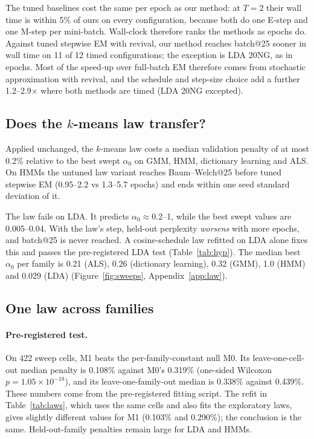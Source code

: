 \documentclass[10pt]{article}
\begin{document}
The tuned baselines cost the same per epoch as our method: at $T = 2$ their wall time is within 5\% of ours on every
configuration, because both do one E-step and one M-step per mini-batch. Wall-clock therefore ranks the methods as
epochs do. Against tuned stepwise EM with revival, our method reaches batch@25 sooner in wall time on 11 of 12 timed
configurations; the exception is LDA 20NG, as in epochs. Most of the speed-up over full-batch EM therefore comes from
stochastic approximation with revival, and the schedule and step-size choice add a further 1.2--2.9$\times$ where
both methods are timed (LDA 20NG excepted).

\subsection{Does the $k$-means law transfer?}\label{sec:res-kmlaw}

Applied unchanged, the $k$-means law costs a median validation penalty of at most 0.2\% relative to the best swept
$\alpha_0$ on GMM, HMM, dictionary learning and ALS. On HMMs the untuned law variant reaches Baum--Welch@25 before
tuned stepwise EM (0.95--2.2 vs 1.3--5.7 epochs) and ends within one seed standard deviation of it.

The law fails on LDA. It predicts $\alpha_0 \approx 0.2$--1, while the best swept values are 0.005--0.04. With the
law's step, held-out perplexity \emph{worsens} with more epochs, and batch@25 is never reached. A cosine-schedule law
refitted on LDA alone fixes this and passes the pre-registered LDA test (Table~\ref{tab:hyp}). The median best
$\alpha_0$ per family is 0.21 (ALS), 0.26 (dictionary learning), 0.32 (GMM), 1.0 (HMM) and 0.029 (LDA)
(Figure~\ref{fig:sweeps}, Appendix~\ref{app:law}).

\subsection{One law across families}\label{sec:res-law}

\paragraph{Pre-registered test.} On 422 sweep cells, M1 beats the per-family-constant null M0. Its leave-one-cell-out
median penalty is 0.108\% against M0's 0.319\% (one-sided Wilcoxon $p = 1.05 \times 10^{-18}$), and its
leave-one-family-out median is 0.338\% against 0.439\%. These numbers come from the pre-registered fitting script.
The refit in Table~\ref{tab:laws}, which uses the same cells and also fits the exploratory laws, gives slightly
different values for M1 (0.103\% and 0.290\%); the conclusion is the same. Held-out-family penalties remain large for
LDA and HMMs.
\end{document}
